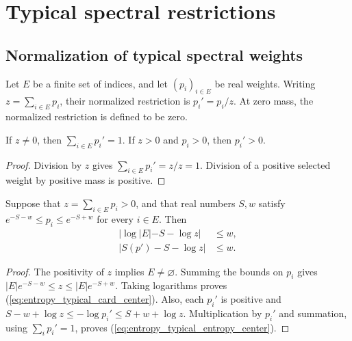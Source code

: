 \section{Typical spectral restrictions}

\subsection{Normalization of typical spectral weights}

\begin{definition}
\label{def:entropy_normalized_restriction}
\leanok
Let $E$ be a finite set of indices, and let $(p_i)_{i\in E}$ be real weights.
Writing $z=\sum_{i\in E}p_i$, their normalized restriction is $p_i'=p_i/z$.
At zero mass, the normalized restriction is defined to be zero.
\end{definition}

\begin{theorem}[Normalization]
\label{thm:entropy_normalized_restriction}
\leanok
{}
If $z\ne0$, then $\sum_{i\in E}p_i'=1$. If $z>0$ and $p_i>0$, then $p_i'>0$.
\end{theorem}
\begin{proof}
\leanok
{}
Division by $z$ gives $\sum_{i\in E}p_i'=z/z=1$.
Division of a positive selected weight by positive mass is positive.
\end{proof}

\begin{theorem}
\label{thm:entropy_typical_centered}
\leanok
{}
Suppose that $z=\sum_{i\in E}p_i>0$, and that real numbers $S,w$ satisfy
$e^{-S-w}\le p_i\le e^{-S+w}$ for every $i\in E$. Then
\begin{align}
 |\log|E|-S-\log z|&\le w,
 \label{eq:entropy_typical_card_center}\\
 |S(p')-S-\log z|&\le w.
 \label{eq:entropy_typical_entropy_center}
\end{align}
\end{theorem}
\begin{proof}
\leanok
{}
The positivity of $z$ implies $E\ne\varnothing$. Summing the bounds on $p_i$
gives $|E|e^{-S-w}\le z\le |E|e^{-S+w}$. Taking logarithms proves
(\ref{eq:entropy_typical_card_center}). Also, each $p_i'$ is positive and
$S-w+\log z\le-\log p_i'\le S+w+\log z$. Multiplication by $p_i'$ and summation,
using $\sum_i p_i'=1$, proves (\ref{eq:entropy_typical_entropy_center}).
\end{proof}

